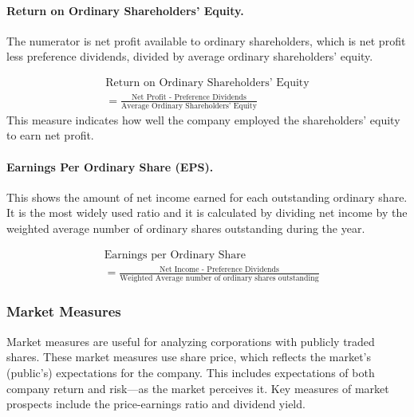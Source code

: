 \documentclass[../main.tex]{subfiles}
\begin{document}
	\paragraph{Return on Ordinary Shareholders' Equity.} The numerator is net 
	profit available to ordinary shareholders, which is net profit less 
	preference dividends, divided by average ordinary shareholders’ equity. 
	
	\begin{equation}
	\begin{aligned}
	\text{Return on Ordinary Shareholders' Equity} \\=\frac{\text{Net Profit - 
	Preference Dividends}}{\text{Average Ordinary Shareholders' Equity}}
	\end{aligned}
	\end{equation}
	This measure indicates how well the company employed the shareholders’ 
	equity to earn net profit.
	
	
	\paragraph{Earnings Per Ordinary Share (EPS).} This shows the amount of net 
	income 
	earned for each outstanding ordinary share. It is the most widely used 
	ratio and it is calculated by dividing net income by the weighted average 
	number of ordinary shares outstanding during the year.

	\begin{equation}
	\begin{aligned}
	&\text{Earnings per Ordinary Share} \\&=\frac{\text{Net Income - 
			Preference Dividends}}{\text{Weighted Average number of ordinary 
			shares outstanding}}
	\end{aligned}
	\end{equation}
	
	\subsubsection{Market Measures}
	
	Market measures are useful for analyzing corporations with publicly traded 
	shares. These market measures use share price, which reflects the market’s 
	(public’s) expectations for the company. This includes expectations of both 
	company return and risk—as the market perceives it.  Key measures of market 
	prospects include the price-earnings ratio and dividend yield.
	
\end{document}
